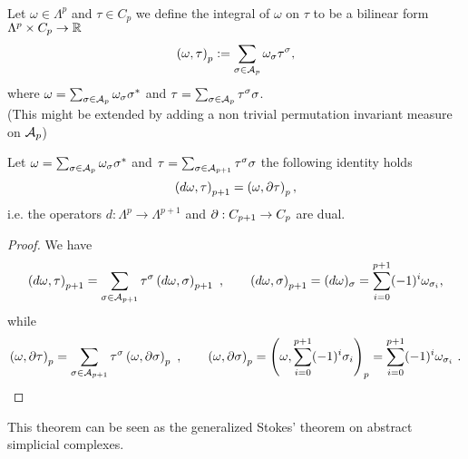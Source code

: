 \documentclass[../1.tex]{subfiles}
\begin{document}
    \begin{defn}
        \\
        Let $\omega \in \Lambda^p$ and $\tau \in C_p$ we define the integral of $\omega$ on $\tau$ to be a bilinear form $\Lambda^p \times C_p \to \mathbb{R}$
        \[ \left(\omega, \tau \right)_p := \sum_{\sigma \in \mathcal{A}_p} \omega_\sigma \tau^\sigma, \]
        where $\omega = \sum_{\sigma \in \mathcal{A}_p} \omega_\sigma \sigma^*$ and $\tau = \sum_{\sigma \in \mathcal{A}_p} \tau^\sigma \sigma$.\\
        (This might be extended by adding a non trivial permutation invariant measure on $\mathcal{A}_p$)
    \end{defn}
    \newpage
    \begin{thm}
        Let $\omega = \sum_{\sigma \in \mathcal{A}_p} \omega_\sigma \sigma^*$ and $\tau = \sum_{\sigma \in \mathcal{A}_{p+1}} \tau^\sigma \sigma$ the following identity holds
        \[ \left(d \omega, \tau \right)_{p+1} = \left(\omega, \partial \tau \right)_p, \]
        i.e. the operators $d : \Lambda^p \to \Lambda^{p+1}$ and $\partial : C_{p+1} \to C_p$ are dual.
    \end{thm}
    \begin{proof}
        We have\\
        \[ \left( d \omega, \tau \right)_{p+1} = \sum_{\sigma \in \mathcal{A}_{p+1}} \tau^\sigma \left( d \omega, \sigma \right)_{p+1} \ , \quad
        \quad \left( d \omega, \sigma \right)_{p+1} = (d \omega)_\sigma = \sum_{i = 0}^{p+1} (-1)^i \omega_{\sigma_i}, \]
        while
        \[ \left( \omega, \partial \tau \right)_p = \sum_{\sigma \in \mathcal{A}_{p+1}} \tau^\sigma \left( \omega, \partial \sigma \right)_p \ , \quad
        \quad \left( \omega, \partial \sigma \right)_p = \left( \omega, \sum_{i = 0}^{p+1} (-1)^i \sigma_i \right)_p = \sum_{i = 0}^{p+1} (-1)^i \omega_{\sigma_i} \ . \]
    \end{proof}
    This theorem can be seen as the generalized Stokes' theorem on abstract simplicial complexes.
\end{document}

